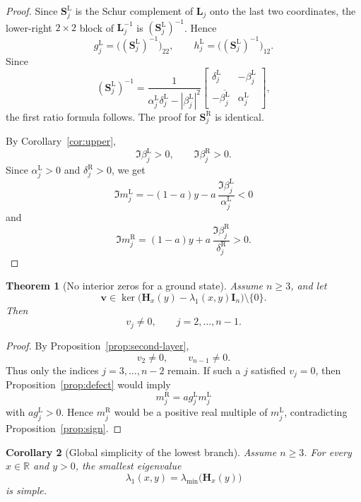 \documentclass[11pt]{article}
\numberwithin{equation}{section}
\newtheorem{theorem}{Theorem}[section]
\newtheorem{corollary}[theorem]{Corollary}
\begin{document}
\begin{proof}
Since $\mathbf S_j^{\mathrm L}$ is the Schur complement of $\mathbf L_j$ onto the
last two coordinates, the lower-right $2\times2$ block of $\mathbf L_j^{-1}$ is
$(\mathbf S_j^{\mathrm L})^{-1}$.  Hence
\[
g_j^{\mathrm L}=\bigl((\mathbf S_j^{\mathrm L})^{-1}\bigr)_{22},
\qquad
h_j^{\mathrm L}=\bigl((\mathbf S_j^{\mathrm L})^{-1}\bigr)_{12}.
\]
Since
\[
(\mathbf S_j^{\mathrm L})^{-1}
=
\frac{1}{\alpha_j^{\mathrm L}\delta_j^{\mathrm L}-|\beta_j^{\mathrm L}|^2}
\begin{bmatrix}
\delta_j^{\mathrm L} & -\beta_j^{\mathrm L}\\
-\overline{\beta_j^{\mathrm L}} & \alpha_j^{\mathrm L}
\end{bmatrix},
\]
the first ratio formula follows.  The proof for $\mathbf S_j^{\mathrm R}$ is
identical.

By Corollary~\ref{cor:upper},
\[
\Im\beta_j^{\mathrm L}>0,
\qquad
\Im\beta_j^{\mathrm R}>0.
\]
Since $\alpha_j^{\mathrm L}>0$ and $\delta_j^{\mathrm R}>0$, we get
\[
\Im m_j^{\mathrm L}
=
-(1-a)y-a\,\frac{\Im\beta_j^{\mathrm L}}{\alpha_j^{\mathrm L}}<0
\]
and
\[
\Im m_j^{\mathrm R}
=
(1-a)y+a\,\frac{\Im\beta_j^{\mathrm R}}{\delta_j^{\mathrm R}}>0.
\]
\end{proof}

\begin{theorem}[No interior zeros for a ground state]\label{thm:nozero}
Assume $n\ge3$, and let
\[
\bm v\in
\ker\bigl(\mathbf H_x(y)-\lambda_1(x,y)\mathbf I_n\bigr)\setminus\{0\}.
\]
Then
\[
v_j\neq0,
\qquad
j=2,\dots,n-1.
\]
\end{theorem}

\begin{proof}
By Proposition~\ref{prop:second-layer},
\[
v_2\neq0,
\qquad
v_{n-1}\neq0.
\]
Thus only the indices $j=3,\dots,n-2$ remain.  If such a $j$ satisfied
$v_j=0$, then Proposition~\ref{prop:defect} would imply
\[
m_j^{\mathrm R}=ag_j^{\mathrm L}m_j^{\mathrm L}
\]
with $ag_j^{\mathrm L}>0$.  Hence $m_j^{\mathrm R}$ would be a positive real
multiple of $m_j^{\mathrm L}$, contradicting Proposition~\ref{prop:sign}.
\end{proof}

\begin{corollary}[Global simplicity of the lowest branch]\label{cor:simple}
Assume $n\ge3$.  For every $x\in\mathbb{R}$ and $y>0$, the smallest eigenvalue
\[
\lambda_1(x,y)=\lambda_{\min}\!\bigl(\mathbf H_x(y)\bigr)
\]
is simple.
\end{corollary}
\end{document}
